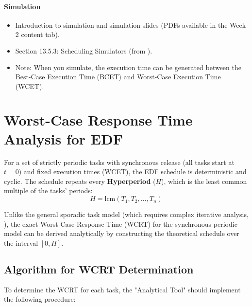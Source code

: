 \documentclass[a4paper,11pt]{article}
\begin{document}
\paragraph{Simulation}
\begin{itemize}
    \item Introduction to simulation and simulation slides (PDFs available in the Week 2 content tab).
    \item Section 13.5.3: Scheduling Simulators (from \cite{buttazzo2024}).
    \item Note: 
    When you simulate, the execution time can be generated between the Best-Case Execution Time (BCET) and Worst-Case Execution Time (WCET).
\end{itemize}


\appendix

\section{Worst-Case Response Time Analysis for EDF}

For a set of strictly periodic tasks with synchronous release (all tasks start at $t=0$) and fixed execution times (WCET), the EDF schedule is deterministic and cyclic. The schedule repeats every \textbf{Hyperperiod} ($H$), which is the least common multiple of the tasks' periods:
\begin{equation}
    H = \text{lcm}(T_1, T_2, \dots, T_n)
\end{equation}

\noindent Unlike the general sporadic task model (which requires complex iterative analysis, \cite{stankovic1998}), the exact Worst-Case Response Time (WCRT) for the synchronous periodic model can be derived analytically by constructing the theoretical schedule over the interval $[0, H]$.

\subsection*{Algorithm for WCRT Determination}
To determine the WCRT for each task, the "Analytical Tool" should implement the following procedure:
\end{document}
